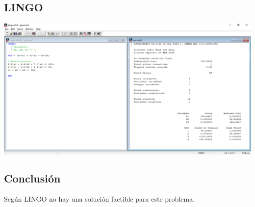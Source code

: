 \documentclass[12pt]{article}
\begin{document}
\subsection*{LINGO}

\begin{center}
  \includegraphics[width=1\textwidth]{./assets/ejercicio2.PNG}
\end{center}

\subsection*{Conclusión}
\noindent Según LINGO no hay una solución factible para este problema.
\end{document}
